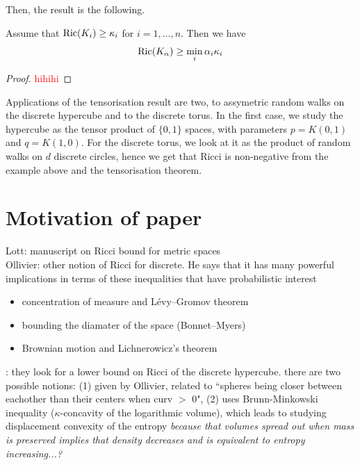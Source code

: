 Then, the result is the following. 

\begin{theorem}
    Assume that $\mathop{\mathrm{Ric}}\nolimits(K_i)\ge \kappa_i$ for $i=1,\ldots,n$. Then we have
    \[
    \mathop{\mathrm{Ric}}\nolimits(K_\alpha)\ge \min_i \alpha_i\kappa_i
    \]
    \begin{proof}
        \textcolor{red}{hihihi}
    \end{proof}
\end{theorem}

Applications of the tensorisation result are two, to assymetric random walks on the discrete hypercube and to the discrete torus. In the first case, we study the hypercube as the tensor product of $\{0,1\}$ spaces, with parameters $p=K(0,1)$ and $q=K(1,0)$. For the discrete torus, we look at it as the product of random walks on $d$ discrete circles, hence we get that Ricci is non-negative from the example above and the tensorisation theorem. 

\section{Motivation of paper}
Lott: manuscript on Ricci bound for metric spaces\\

Ollivier: other notion of Ricci for discrete. He says that it has many powerful implications in terms of these inequalities that have probabilistic interest
\begin{itemize}
    \item concentration of measure and Lévy–Gromov theorem
    \item bounding the diamater of the space (Bonnet–Myers)
    \item Brownian motion and Lichnerowicz’s theorem
\end{itemize}


\cite{olliviervillani}:
they look for a lower bound on Ricci of the discrete hypercube. there are two possible notions: (1) given by Ollivier, related to ``spheres being closer between eachother than their centers when curv $>$ 0", (2) uses Brunn-Minkowski inequality ($\kappa$-concavity of the logarithmic volume), which leads to studying displacement convexity of the entropy \textit{because that volumes spread out when mass is preserved implies that density decreases and is equivalent to entropy increasing...?}
\\

